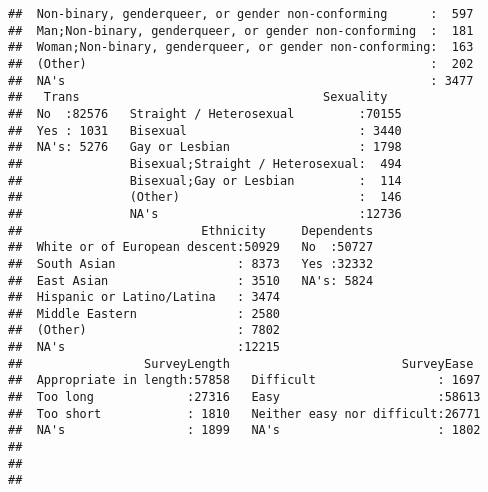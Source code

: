 \documentclass[]{article}
\begin{document}
\begin{verbatim}
##  Non-binary, genderqueer, or gender non-conforming      :  597  
##  Man;Non-binary, genderqueer, or gender non-conforming  :  181  
##  Woman;Non-binary, genderqueer, or gender non-conforming:  163  
##  (Other)                                                :  202  
##  NA's                                                   : 3477  
##   Trans                                  Sexuality    
##  No  :82576   Straight / Heterosexual         :70155  
##  Yes : 1031   Bisexual                        : 3440  
##  NA's: 5276   Gay or Lesbian                  : 1798  
##               Bisexual;Straight / Heterosexual:  494  
##               Bisexual;Gay or Lesbian         :  114  
##               (Other)                         :  146  
##               NA's                            :12736  
##                         Ethnicity     Dependents  
##  White or of European descent:50929   No  :50727  
##  South Asian                 : 8373   Yes :32332  
##  East Asian                  : 3510   NA's: 5824  
##  Hispanic or Latino/Latina   : 3474               
##  Middle Eastern              : 2580               
##  (Other)                     : 7802               
##  NA's                        :12215               
##                 SurveyLength                        SurveyEase   
##  Appropriate in length:57858   Difficult                 : 1697  
##  Too long             :27316   Easy                      :58613  
##  Too short            : 1810   Neither easy nor difficult:26771  
##  NA's                 : 1899   NA's                      : 1802  
##                                                                  
##                                                                  
## 
\end{verbatim}
\end{document}
